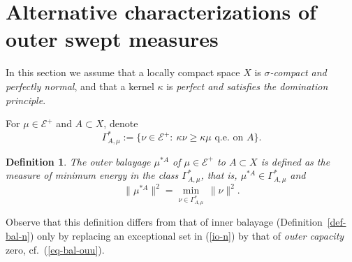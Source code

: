 \documentclass[12pt,a4paper,reqno]{amsart} %
\theoremstyle{lause}
\theoremstyle{maaritelma}
\theoremstyle{lause}
\theoremstyle{maaritelma}
\newtheorem{definition}[theorem]{Definition}
\numberwithin{equation}{section}
\begin{document}
\section{Alternative characterizations of outer swept measures}\label{sec-bal-ou}

In this section we assume that a locally compact space $X$ is {\it $\sigma$-com\-pact and perfectly normal}, and that a kernel $\kappa$ is {\it perfect and satisfies the domination principle}.

For $\mu\in\mathcal E^+$ and $A\subset X$, denote
\begin{equation}\label{eq-bal-ouu}\Gamma_{A,\mu}^*:=\bigl\{\nu\in\mathcal E^+: \ \kappa\nu\geqslant\kappa\mu\text{ \ q.e.\ on $A$}\bigr\}.\end{equation}

\begin{definition}\label{def-ou-ba}The {\it outer balayage\/} $\mu^{*A}$ of $\mu\in\mathcal E^+$ to $A\subset X$ is defined as the measure of minimum energy in the class $\Gamma_{A,\mu}^*$, that is,  $\mu^{*A}\in\Gamma_{A,\mu}^*$ and
\begin{equation*}\|\mu^{*A}\|^2=\min_{\nu\in\Gamma_{A,\mu}^*}\,\|\nu\|^2.\end{equation*}\end{definition}

Observe that this definition differs from that of inner balayage (Definition~\ref{def-bal-n}) only by replacing an exceptional set in (\ref{io-n}) by that of {\it outer capacity\/} zero, cf.\ (\ref{eq-bal-ouu}).
\end{document}
